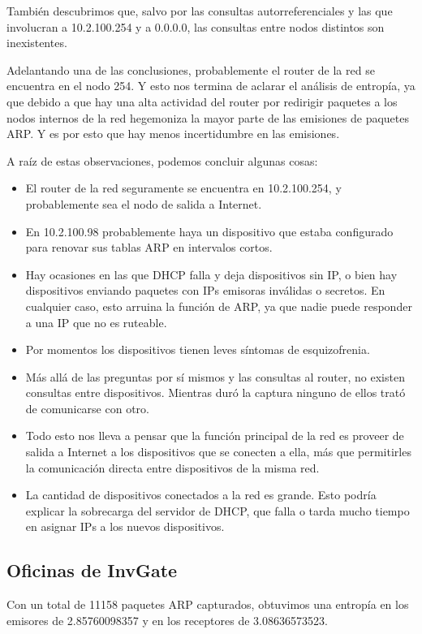También descubrimos que, salvo por las consultas autorreferenciales y las que
involucran a 10.2.100.254 y a 0.0.0.0, las consultas entre nodos distintos son
inexistentes.

Adelantando una de las conclusiones, probablemente el router de la red se encuentra en el nodo 254. Y esto nos termina de aclarar el análisis de entropía, ya que debido a que hay una alta actividad del router por redirigir paquetes a los nodos internos de la red hegemoniza la mayor parte de las emisiones de paquetes ARP. Y es por esto que hay menos incertidumbre en las emisiones.

A raíz de estas observaciones, podemos concluir algunas cosas:
\begin{itemize}
  \item El router de la red seguramente se encuentra en 10.2.100.254, y
probablemente sea el nodo de salida a Internet.
  \item En 10.2.100.98 probablemente haya un dispositivo que estaba configurado
para renovar sus tablas ARP en intervalos cortos.
  \item Hay ocasiones en las que DHCP falla y deja dispositivos sin IP, o bien
hay dispositivos enviando paquetes con IPs emisoras inválidas o secretos. En
cualquier caso, esto arruina la función de ARP, ya que nadie puede
responder a una IP que no es ruteable.
  \item Por momentos los dispositivos tienen leves síntomas de
esquizofrenia.
  \item Más allá de las preguntas por sí mismos y las consultas al router, no
existen consultas entre dispositivos. Mientras duró la captura ninguno de ellos
trató de comunicarse con otro.
  \item Todo esto nos lleva a pensar que la función principal de la red es
proveer de salida a Internet a los dispositivos que se conecten a ella, más que
permitirles la comunicación directa entre dispositivos de la misma red.
  \item La cantidad de dispositivos conectados a la red es grande.  Esto podría
explicar la sobrecarga del servidor de DHCP, que falla o tarda mucho tiempo en
asignar IPs a los nuevos dispositivos. 
\end{itemize}

\newpage
\subsection{Oficinas de InvGate}
Con un total de 11158 paquetes ARP capturados, obtuvimos una entropía en los
emisores de 2.85760098357 y en los receptores de 3.08636573523.

